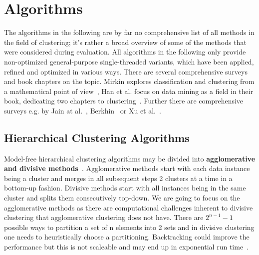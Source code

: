 \chapter{Algorithms}\label{\positionnumber}
The algorithms in the following are by far no comprehensive list of all methods in the field of clustering; it's rather a broad overview of some of the methods that were considered during evaluation. All algorithms in the following only provide non-optimized general-purpose single-threaded variants, which have been applied, refined and optimized in various ways. There are several comprehensive surveys and book chapters on the topic. Mirkin explores classification and clustering from a mathematical point of view~\cite{mirkin2013mathematical}, Han et al. focus on data mining as a field in their book, dedicating two chapters to clustering~\cite{han2011data}. Further there are comprehensive surveys e.g. by Jain at al.~\cite{overview_clust}, Berkhin~\cite{berkhin2006survey} or Xu et al.~\cite{xu2005survey}. 


\section{Hierarchical Clustering Algorithms}\label{\positionnumber}
Model-free hierarchical clustering algorithms may be divided into \textbf{agglomerative and divisive methods}~\cite{han2011data}. Agglomerative methods start with each data instance being a cluster and merges in all subsequent steps 2 clusters at a time in a bottom-up fashion. Divisive methods start with all instances being in the same cluster and splits them consecutively top-down. We are going to focus on the agglomerative methods as there are computational challenges inherent to divisive clustering that agglomerative clustering does not have. There are $2^{n-1}-1$ possible ways to partition a set of n elements into 2 sets and in divisive clustering one needs to heuristically choose a partitioning. Backtracking could improve the performance but this is not scaleable and may end up in exponential run time~\cite{han2011data}. \\

